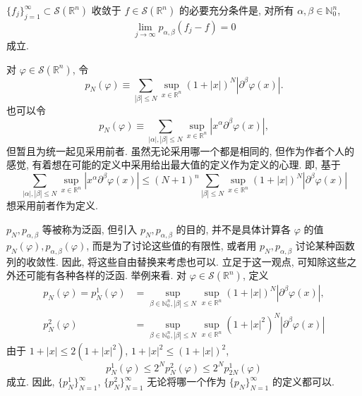 \begin{theorem}\label{thm:5.1}
$\{f_{j}\}_{j=1}^{\infty} \subset \mathcal{S}(\mathbb{R}^{n})$ 收敛于 $f \in \mathcal{S}(\mathbb{R}^{n})$ 的必要充分条件是, 对所有 $\alpha, \beta \in \mathbb{N}_{0}^{n}$,
\[
\lim_{j \to \infty}p_{\alpha,\beta}(f_{j}-f) = 0
\]
成立.
\end{theorem}

对 $\varphi \in \mathcal{S}(\mathbb{R}^{n})$, 令
\[
p_{N}(\varphi) \equiv \sum_{|\beta| \leq N}\sup_{x \in \mathbb{R}^{n}}(1+|x|)^{N}|\partial^{\beta}\varphi(x)|.
\]
也可以令
\[
p_{N}(\varphi) \equiv \sum_{|\alpha|, |\beta| \leq N}\sup_{x \in \mathbb{R}^{n}}|x^{\alpha}\partial^{\beta}\varphi(x)|,
\]
但暂且为统一起见采用前者. 虽然无论采用哪一个都是相同的, 但作为作者个人的感觉, 有着想在可能的定义中采用给出最大值的定义作为定义的心理. 即, 基于
\[
\sum_{|\alpha|, |\beta| \leq N}\sup_{x \in \mathbb{R}^{n}}|x^{\alpha}\partial^{\beta}\varphi(x)| \leq (N+1)^{n}\sum_{|\beta| \leq N}\sup_{x \in \mathbb{R}^{n}}(1+|x|)^{N}|\partial^{\beta}\varphi(x)|
\]
想采用前者作为定义.

\begin{example}\label{exa:5.5}
$p_{N}, p_{\alpha,\beta}$ 等被称为泛函, 但引入 $p_{N}, p_{\alpha,\beta}$ 的目的, 并不是具体计算各 $\varphi$ 的值 $p_{N}(\varphi), p_{\alpha,\beta}(\varphi)$, 而是为了讨论这些值的有限性, 或者用 $p_{N}, p_{\alpha,\beta}$ 讨论某种函数列的收敛性. 因此, 将这些自由替换来考虑也可以. 立足于这一观点, 可知除这些之外还可能有各种各样的泛函. 举例来看. 对 $\varphi \in \mathcal{S}(\mathbb{R}^{n})$, 定义
\[
\begin{aligned}
p_{N}(\varphi) = p_{N}^{1}(\varphi) &= \sup_{\beta \in \mathbb{N}_{0}^{n}, |\beta| \leq N}\sup_{x \in \mathbb{R}^{n}}(1+|x|)^{N}|\partial^{\beta}\varphi(x)|, \\
p_{N}^{2}(\varphi) &= \sup_{\beta \in \mathbb{N}_{0}^{n}, |\beta| \leq N}\sup_{x \in \mathbb{R}^{n}}(1+|x|^{2})^{N}|\partial^{\beta}\varphi(x)|
\end{aligned}
\]
由于 $1+|x| \leq 2(1+|x|^{2})$, $1+|x|^{2} \leq (1+|x|)^{2}$,
\[
p_{N}^{1}(\varphi) \leq 2^{N}p_{N}^{2}(\varphi) \leq 2^{N}p_{2N}^{1}(\varphi)
\]
成立. 因此, $\{p_{N}^{1}\}_{N=1}^{\infty}$, $\{p_{N}^{2}\}_{N=1}^{\infty}$ 无论将哪一个作为 $\{p_{N}\}_{N=1}^{\infty}$ 的定义都可以.
\end{example}

